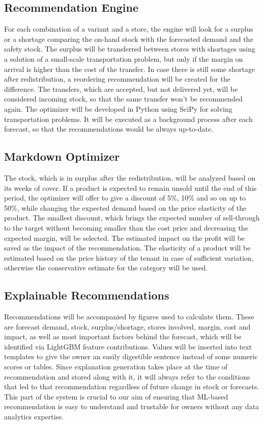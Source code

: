\documentclass{StockSense}
\begin{document}
\subsection{Recommendation Engine}

For each combination of a variant and a store, the engine will look for a surplus or a shortage comparing the on-hand stock with the forecasted demand and the safety stock. The surplus will be transferred between stores with shortages using a solution of a small-scale transportation problem, but only if the margin on arrival is higher than the cost of the transfer. In case there is still some shortage after redistribution, a reordering recommendation will be created for the difference. The transfers, which are accepted, but not delivered yet, will be considered incoming stock, so that the same transfer won't be recommended again. The optimizer will be developed in Python using SciPy for solving transportation problems. It will be executed as a background process after each forecast, so that the recommendations would be always up-to-date.

\subsection{Markdown Optimizer}

The stock, which is in surplus after the redistribution, will be analyzed based on its weeks of cover. If a product is expected to remain unsold until the end of this period, the optimizer will offer to give a discount of 5\%, 10\% and so on up to 50\%, while changing the expected demand based on the price elasticity of the product. The smallest discount, which brings the expected number of sell-through to the target without becoming smaller than the cost price and decreasing the expected margin, will be selected. The estimated impact on the profit will be saved as the impact of the recommendation. The elasticity of a product will be estimated based on the price history of the tenant in case of sufficient variation, otherwise the conservative estimate for the category will be used.

\subsection{Explainable Recommendations}

Recommendations will be accompanied by figures used to calculate them. These are forecast demand, stock, surplus/shortage, stores involved, margin, cost and impact, as well as most important factors behind the forecast, which will be identified via LightGBM feature contributions. Values will be inserted into text templates to give the owner an easily digestible sentence instead of some numeric scores or tables. Since explanation generation takes place at the time of recommendation and stored along with it, it will always refer to the conditions that led to that recommendation regardless of future change in stock or forecasts. This part of the system is crucial to our aim of ensuring that ML-based recommendation is easy to understand and trustable for owners without any data analytics expertise.
\end{document}
